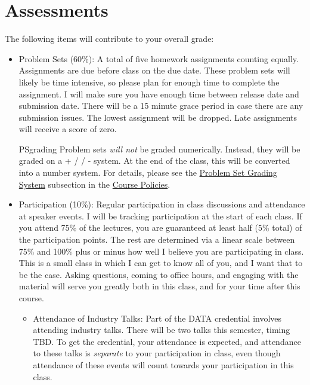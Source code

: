 \documentclass[11pt]{article}
\begin{document}
\section*{Assessments}
The following items will contribute to your overall grade:

\begin{itemize}
    
    \item Problem Sets (60\%): A total of five homework assignments counting equally. Assignments are due before class on the due date. These problem sets will likely be time intensive, so please plan for enough time to complete the assignment. I will make sure you have enough time between release date and submission date. There will be a 15 minute grace period in case there are any submission issues. The lowest assignment will be dropped. Late assignments will receive a score of zero. 
    
    \begin{ToggleSect}{PSgrading}
    Problem sets \textit{will not} be graded numerically. Instead, they will be graded on a \checkmark + / \checkmark / \checkmark - system. At the end of the class, this will be converted into a number system. For details, please see the \hyperref[subsec:PSgrading]{Problem Set Grading System} subsection in the \hyperref[sec:Policies]{Course Policies}.
    \end{ToggleSect}
    
    \item Participation (10\%): Regular participation in class discussions and attendance at speaker events. I will be tracking participation at the start of each class. If you attend 75\% of the lectures, you are guaranteed at least half (5\% total) of the participation points. The rest are determined via a linear scale between 75\% and 100\% plus or minus how well I believe you are participating in class. This is a small class in which I can get to know all of you, and I want that to be the case. Asking questions, coming to office hours, and engaging with the material will serve you greatly both in this class, and for your time after this course.
    
    \begin{itemize}
    	\item Attendance of Industry Talks: Part of the DATA credential involves attending industry talks. There will be two talks this semester, timing TBD. To get the credential, your attendance is expected, and attendance to these talks is \textit{separate} to your participation in class, even though attendance of these events will count towards your participation in this class.
    \end{itemize}
    

\end{itemize}
\end{document}
